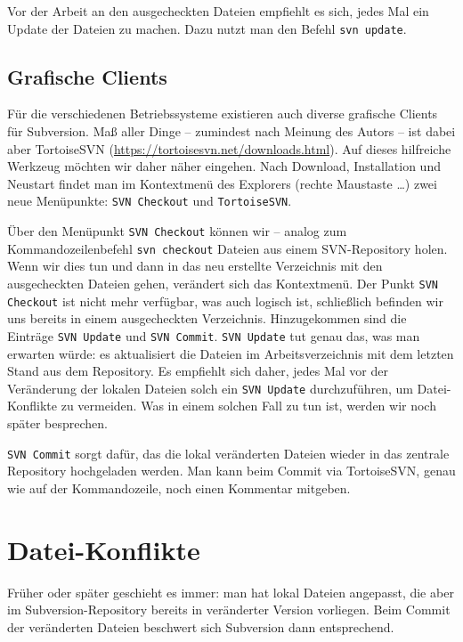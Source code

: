 Vor der Arbeit an den ausgecheckten Dateien empfiehlt es sich, jedes Mal ein Update der Dateien zu machen. Dazu nutzt man den Befehl \texttt{svn update}.  

\subsection{Grafische Clients}

Für die verschiedenen Betriebssysteme existieren auch diverse grafische Clients für Subversion.
Maß aller Dinge -- zumindest nach Meinung des Autors -- ist dabei aber TortoiseSVN (\url{https://tortoisesvn.net/downloads.html}). 
Auf dieses hilfreiche Werkzeug möchten wir daher näher eingehen. 
Nach Download, Installation und Neustart findet man im Kontextmenü des Explorers (rechte Maustaste \ldots)  zwei neue Menüpunkte: \texttt{SVN Checkout} und \texttt{TortoiseSVN}.

Über den Menüpunkt \texttt{SVN Checkout} können wir -- analog zum Kommandozeilenbefehl \texttt{svn checkout} Dateien aus einem SVN-Repository holen.
Wenn wir dies tun und dann in das neu erstellte Verzeichnis mit den ausgecheckten Dateien gehen, verändert sich das Kontextmenü. Der Punkt \texttt{SVN Checkout} ist nicht mehr verfügbar, was auch logisch ist, schließlich befinden wir uns bereits in einem ausgecheckten Verzeichnis. Hinzugekommen sind die Einträge \texttt{SVN Update} und \texttt{SVN Commit}. \texttt{SVN Update} tut genau das, was man erwarten würde: es aktualisiert die Dateien im Arbeitsverzeichnis mit dem letzten Stand aus dem Repository. Es empfiehlt sich daher, jedes Mal vor der Veränderung der lokalen Dateien solch ein \texttt{SVN Update} durchzuführen, um Datei-Konflikte zu vermeiden. Was in einem solchen Fall zu tun ist, werden wir noch später besprechen.

\texttt{SVN Commit} sorgt dafür, das die lokal veränderten Dateien wieder in das zentrale Repository hochgeladen werden. Man kann beim Commit via TortoiseSVN, genau wie auf der Kommandozeile, noch einen Kommentar mitgeben.

\section{Datei-Konflikte}

Früher oder später geschieht es immer: man hat lokal Dateien angepasst, die aber im Subversion-Repository bereits in veränderter Version vorliegen. Beim Commit der veränderten Dateien beschwert sich Subversion dann entsprechend.

